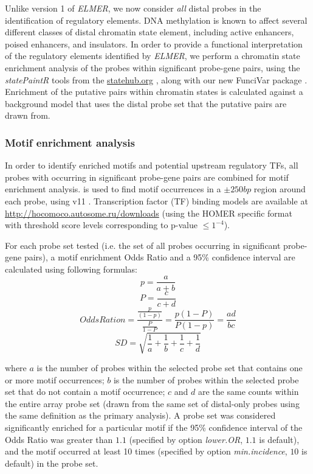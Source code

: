 Unlike version 1 of \textit{ELMER}, we now consider \textit{all} distal probes in the identification of regulatory elements. DNA methylation is known to affect several different classes of distal chromatin state element, including active enhancers, poised enhancers, and insulators. In order to provide a functional interpretation of the regulatory elements identified by \textit{ELMER}, we perform a chromatin state enrichment analysis of the probes within significant probe-gene pairs, using the \textit{statePaintR} tools from the \url{statehub.org} \cite{statepaintr}, along with our new FunciVar package \cite{funcivar}. Enrichment of the putative pairs within chromatin states is calculated against a background model that uses the distal probe set that the putative pairs are drawn from. 

\subsubsection*{Motif enrichment analysis}

In order to identify enriched motifs and potential upstream regulatory TFs, all probes with occurring in significant probe-gene pairs are combined for motif enrichment analysis.  \cite{heinz2010simple} is used to find motif occurrences in a $\pm 250bp$ region around each probe, using  v11 \cite{kulakovskiy2016hocomoco} . Transcription factor (TF) binding models are available at \url{http://hocomoco.autosome.ru/downloads} (using the HOMER specific format with threshold score levels corresponding to p-value $ \leq 1^{-4}$). 

For each probe set tested (i.e. the set of all probes occurring in significant probe-gene pairs), a motif enrichment Odds Ratio and a 95\% confidence interval are calculated using following formulas:
$$p = \frac{a}{a + b}$$
$$P = \frac{c}{c + d}$$
$$Odds Ration = \frac{\frac{p}{(1-p)}}{\frac{P}{1-P}}= \frac{p(1-P)}{P(1-p)}=\frac{ad}{bc}$$
$$SD = \sqrt{\frac{1}{a} + \frac{1}{b} + \frac{1}{c} + \frac{1}{d}}$$

where $a$ is the number of probes within the selected probe set that contains one 
or more motif occurrences; $b$ is the number of probes within the selected probe 
set that do not contain a motif occurrence; $c$ and $d$ are the same counts within 
the entire array probe set (drawn from the same set of distal-only probes using the same definition as the primary analysis). A probe set was considered significantly enriched 
for a particular motif if the 95\% confidence interval of the Odds Ratio was 
greater than $1.1$ (specified by option \textit{lower.OR}, $1.1$ is default), and the motif 
occurred at least 10 times (specified by option \textit{min.incidence}, $10$ is default) in 
the probe set. 

